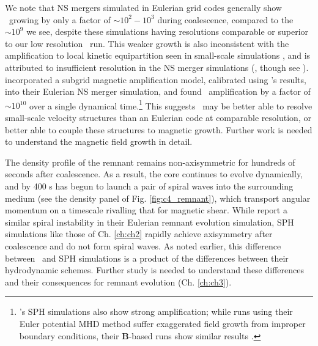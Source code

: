 
We note that NS mergers simulated in Eulerian grid codes generally show \EB\ growing by only a factor of $\sim10^2-10^3$ during coalescence, compared to the $\sim10^9$ we see, despite these simulations having resolutions comparable or superior to our low resolution \arepo\ run.  This weaker growth is also inconsistent with the amplification to local kinetic equipartition seen in small-scale simulations \citep{oberam10, zrakm13}, and is attributed to insufficient resolution in the NS merger simulations (\citealt{kiuc+14,giac+15}, though see \citealt{dionar15}).  \cite{giac+15} incorporated a subgrid magnetic amplification model, calibrated using \cite{zrakm13}'s results, into their Eulerian NS merger simulation, and found \EB\ amplification by a factor of $\sim10^{10}$ over a single dynamical time.\footnote{\cite{pricr06}'s SPH simulations also show strong amplification; while runs using their Euler potential MHD method suffer exaggerated field growth from improper boundary conditions, their $\boldsymbol{B}$-based runs show similar results \citep{pric12}.}  This suggests \arepo\ may be better able to resolve small-scale velocity structures than an Eulerian code at comparable resolution, or better able to couple these structures to magnetic growth.  Further work is needed to understand the magnetic field growth in detail.

The density profile of the remnant remains non-axisymmetric for hundreds of seconds after coalescence.  As a result, the core continues to evolve dynamically, and by 400 s has begun to launch a pair of spiral waves into the surrounding medium (see the density panel of Fig. \ref{fig:c4_remnant}), which transport angular momentum on a timescale rivalling that for magnetic shear.  While \cite{kash+15} report a similar spiral instability in their Eulerian remnant evolution simulation, SPH simulations like those of Ch. \ref{ch:ch2} rapidly achieve axisymmetry after coalescence and do not form spiral waves.  As noted earlier, this difference between \arepo\ and SPH simulations is a product of the differences between their hydrodynamic schemes.  Further study is needed to understand these differences and their consequences for remnant evolution (Ch. \ref{ch:ch3}).


